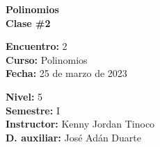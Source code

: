 \begin{center} \textbf
{
    \Large Polinomios \\ \vspace{2mm}Clase \#2
}
\end{center}

\begin{multicols}{2}
{
    \textbf{Encuentro:} 2\\
    \textbf{Curso:} Polinomios\\
    \textbf{Fecha:} 25 de marzo de 2023\\
    \begin{flushright}
        \textbf{Nivel:} 5\\
        \textbf{Semestre:} I\\
        \textbf{Instructor:} Kenny Jordan Tinoco\\
        \textbf{D. auxiliar: }José Adán Duarte
    \end{flushright}
}
\end{multicols}

\thispagestyle{first-page-style}